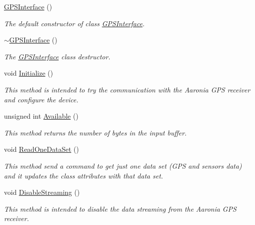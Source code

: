 \begin{DoxyCompactItemize}
\item 
\hyperlink{classGPSInterface_a91c9f19d6588bcd34a8038bdc036c20c}{G\+P\+S\+Interface} ()
\begin{DoxyCompactList}\small\item\em The default constructor of class \hyperlink{classGPSInterface}{G\+P\+S\+Interface}. \end{DoxyCompactList}\item 
\hyperlink{classGPSInterface_ac8156be0348867ab39ba6e7909e16c3b}{$\sim$\+G\+P\+S\+Interface} ()
\begin{DoxyCompactList}\small\item\em The \hyperlink{classGPSInterface}{G\+P\+S\+Interface} class\textquotesingle{} destructor. \end{DoxyCompactList}\item 
void \hyperlink{classGPSInterface_ac4a2712c98235f5ca2d826525180840b}{Initialize} ()
\begin{DoxyCompactList}\small\item\em This method is intended to try the communication with the Aaronia G\+PS receiver and configure the device. \end{DoxyCompactList}\item 
unsigned int \hyperlink{classGPSInterface_a3f92ed959a1ea60258e48ca7c379aec1}{Available} ()
\begin{DoxyCompactList}\small\item\em This method returns the number of bytes in the input buffer. \end{DoxyCompactList}\item 
\mbox{\label{classGPSInterface_acfbd1398a99916c1009b0ac00098ca67}} 
void \hyperlink{classGPSInterface_acfbd1398a99916c1009b0ac00098ca67}{Read\+One\+Data\+Set} ()
\begin{DoxyCompactList}\small\item\em This method send a command to get just one data set (G\+PS and sensors data) and it updates the class attributes with that data set. \end{DoxyCompactList}\item 
void \hyperlink{classGPSInterface_a663c36374cc097040cb8945a3c25b190}{Disable\+Streaming} ()
\begin{DoxyCompactList}\small\item\em This method is intended to disable the data streaming from the Aaronia G\+PS receiver. \end{DoxyCompactList}\item 

\end{DoxyCompactItemize}
